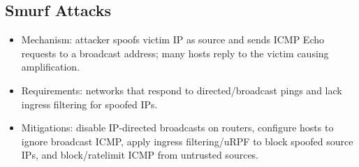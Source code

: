 \documentclass[12pt]{article}
\begin{document}
\subsection{Smurf Attacks}
\begin{itemize}
  \item Mechanism: attacker spoofs victim IP as source and sends ICMP Echo requests to a broadcast address; many hosts reply to the victim causing amplification.
  \item Requirements: networks that respond to directed/broadcast pings and lack ingress filtering for spoofed IPs.
  \item Mitigations: disable IP-directed broadcasts on routers, configure hosts to ignore broadcast ICMP, apply ingress filtering/uRPF to block spoofed source IPs, and block/ratelimit ICMP from untrusted sources.
\end{itemize}

\hrulefill
\end{document}
